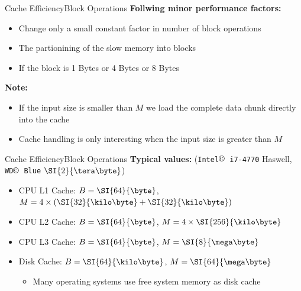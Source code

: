 \begin{frame}{Cache Efficiency}{Block Operations}
  \textbf{Follwing minor performance factors:}\\
  \begin{itemize}
    \item<2->
    Change only a small constant factor in number of block operations
    \item<3->
      The  partionining of the slow memory into blocks
    \item<4->
      If the block is {\color{Mittel-Blau}1 Bytes} or {\color{Mittel-Blau}4 Bytes} or {\color{Mittel-Blau}8 Bytes}
  \end{itemize}
  \vspace{1.0em}
  \textbf{Note:}\\
  \begin{itemize}
    \item<6->
      If the {\color{Mittel-Blau}input size} is
      {\color{Mittel-Blau}smaller than $M$} we load the complete data chunk
      directly into the cache
    \item<7->
      Cache handling is only interesting when the
      {\color{Mittel-Blau}input size} is
      {\color{Mittel-Blau}greater than $M$}
  \end{itemize}
\end{frame}


\begin{frame}{Cache Efficiency}{Block Operations}
  \textbf{Typical values:}
  (\texttt{Intel$\copyright$ i7-4770} Haswell,
  \texttt{WD$\copyright$ Blue} $\SI{2}{\tera\byte}$)
  \begin{itemize}
    \item<2->
      CPU L1 Cache: {\color{Mittel-Blau}$B = \SI{64}{\byte}$},
      {\color{Mittel-Blau}$M = 4 \times (\SI{32}{\kilo\byte} + \SI{32}{\kilo\byte})$}
    \item<3->
      CPU L2 Cache: {\color{Mittel-Blau}$B = \SI{64}{\byte}$}, {\color{Mittel-Blau}$M = 4 \times \SI{256}{\kilo\byte}$}
    \item<4->
      CPU L3 Cache: {\color{Mittel-Blau}$B = \SI{64}{\byte}$}, {\color{Mittel-Blau}$M = \SI{8}{\mega\byte}$}
    \item<4->
      Disk Cache: {\color{Mittel-Blau}$B = \SI{64}{\kilo\byte}$}, {\color{Mittel-Blau}$M = \SI{64}{\mega\byte}$}
    \begin{itemize}
      \item<5->
        Many operating systems use free system memory as disk cache
    \end{itemize}
  \end{itemize}
\end{frame}

